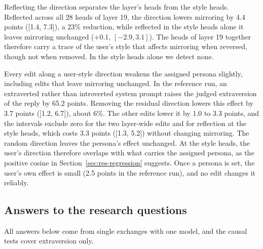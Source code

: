 Reflecting the direction separates the layer's heads from the style heads. Reflected across all 28 heads of layer 19, the direction lowers mirroring by 4.4 points ([1.4, 7.3]), a 23\% reduction, while reflected in the style heads alone it leaves mirroring unchanged ($+0.1$, $[-2.9, 3.1]$). The heads of layer 19 together therefore carry a trace of the user's style that affects mirroring when reversed, though not when removed. In the style heads alone we detect none.

Every edit along a user-style direction weakens the assigned persona slightly, including edits that leave mirroring unchanged. In the reference run, an extraverted rather than introverted system prompt raises the judged extraversion of the reply by 65.2 points. Removing the residual direction lowers this effect by 3.7 points ([1.2, 6.7]), about 6\%. The other edits lower it by 1.0 to 3.3 points, and the intervals exclude zero for the two layer-wide edits and for reflection at the style heads, which costs 3.3 points ([1.3, 5.2]) without changing mirroring. The random direction leaves the persona's effect unchanged. At the style heads, the user's direction therefore overlaps with what carries the assigned persona, as the positive cosine in Section~\ref{sec:res-regression} suggests. Once a persona is set, the user's own effect is small (2.5 points in the reference run), and no edit changes it reliably.

\subsection{Answers to the research questions}
\label{sec:res-rq}

All answers below come from single exchanges with one model, and the causal tests cover extraversion only.


